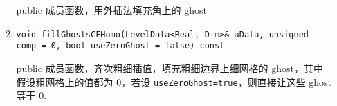 \documentclass[cn, bibend=bibtex]{elegantpaper}
\theoremstyle{plain}
\begin{document}
\begin{itemize}
\begin{enumerate}
    public 成员函数，用外插法填充角上的 ghost

    \item \lstinline|void fillGhostsCFHomo(LevelData<Real, Dim>& aData, unsigned comp = 0, bool useZeroGhost = false) const|

    public 成员函数，齐次粗细插值，填充粗细边界上细网格的 ghost，其中假设粗网格上的值都为 $0$，若设 \lstinline|useZeroGhost=true|，则直接让这些 ghost 等于 $0$.

    

  \end{enumerate}
\end{itemize}




\end{document}
